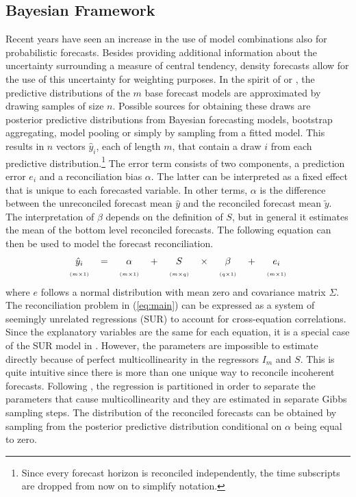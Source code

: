 \documentclass[a4paper,fleqn,11pt]{article}
\begin{document}
\subsection{Bayesian Framework}
\label{sec:model}
Recent years have seen an increase in the use of model combinations also for probabilistic forecasts. Besides providing additional information about the uncertainty surrounding a measure of central tendency, density forecasts allow for the use of this uncertainty for weighting purposes. In the spirit of \cite{Kapetanios2015} or \cite{Cesur2016}, the predictive distributions of the $m$ base forecast models are approximated by drawing samples of size $n$. Possible sources for obtaining these draws are posterior predictive distributions from Bayesian forecasting models, bootstrap aggregating, model pooling or simply by sampling from a fitted model. This results in $n$ vectors $\hat{y}_{i}$, each of length $m$, that contain a draw $i$ from each predictive distribution.\footnote{Since every forecast horizon is reconciled independently, the time subscripts are dropped from now on to simplify notation.} The error term consists of two components, a prediction error $e_{i}$ and a reconciliation bias $\alpha$. The latter can be interpreted as a fixed effect that is unique to each forecasted variable. In other terms, $\alpha$ is the difference between the unreconciled forecast mean $\hat{y}$ and the reconciled forecast mean $\tilde{y}$. The interpretation of $\beta$ depends on the definition of $S$, but in general it estimates the mean of the bottom level reconciled forecasts. The following equation can then be used to model the forecast reconciliation.
\begin{align}
\label{eq:main}
\begin{tabular}{ccccccccc}
	$\hat{y}_i$ & $=$ & $\alpha$ & + &$S$ & $\times$ & $\beta$ & $+$ & $e_i$ \\
	$\scriptscriptstyle (m\times 1)$ & & $\scriptscriptstyle (m\times 1)$  & & $ \scriptscriptstyle (m\times q) $ & & $\scriptscriptstyle (q\times 1)$ & & $\scriptscriptstyle (m\times 1)$
\end{tabular}
\end{align}
where $e$ follows a normal distribution with mean zero and covariance matrix $\Sigma$. The reconciliation problem in (\ref{eq:main}) can be expressed as a system of seemingly unrelated regressions (SUR) to account for cross-equation correlations. Since the explanatory variables are the same for each equation, it is a special case of the SUR model in \cite{Zellner1962}. However, the parameters are impossible to estimate directly because of perfect multicollinearity in the regressors $I_m$ and $S$. This is quite intuitive since there is more than one unique way to reconcile incoherent forecasts. Following \cite{Farebrother1978}, the regression is partitioned in order to separate the parameters that cause multicollinearity and they are estimated in separate Gibbs sampling steps. The distribution of the reconciled forecasts can be obtained by sampling from the posterior predictive distribution conditional on $\alpha$ being equal to zero.
\end{document}
